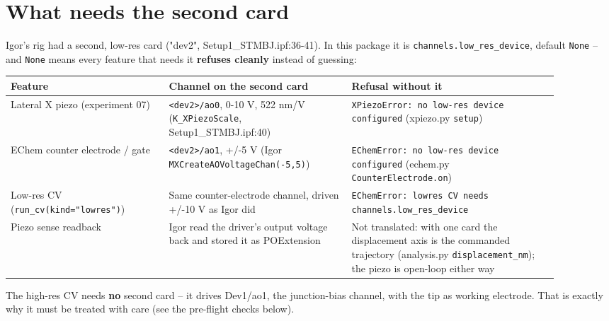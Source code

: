 \section{What needs the second card}

Igor's rig had a second, low-res card ("dev2", Setup1\_STMBJ.ipf:36-41). In this package it is \texttt{channels.\discretionary{}{}{}low\_\discretionary{}{}{}res\_\discretionary{}{}{}device}, default \texttt{None} -- and \texttt{None} means every feature that needs it \textbf{refuses cleanly} instead of guessing:

\small\setlength{\LTleft}{0pt}\setlength{\LTright}{\fill}
\begin{longtable}{@{}>{\raggedright\arraybackslash}p{0.26\linewidth}>{\raggedright\arraybackslash}p{0.30\linewidth}>{\raggedright\arraybackslash}p{0.34\linewidth}@{}}
\toprule
\textbf{Feature} & \textbf{Channel on the second card} & \textbf{Refusal without it} \\
\midrule\endhead
Lateral X piezo (experiment 07) & \texttt{<dev2>/\discretionary{}{}{}ao0}, 0-10 V, 522 nm/V (\texttt{K\_\discretionary{}{}{}XPiezo\discretionary{}{}{}Scale}, Setup1\_STMBJ.ipf:40) & \texttt{XPiezo\discretionary{}{}{}Error: no low-res device configured} (xpiezo.py \texttt{setup}) \\
EChem counter electrode / gate & \texttt{<dev2>/\discretionary{}{}{}ao1}, +/-5 V (Igor \texttt{MXCreate\discretionary{}{}{}AOVoltage\discretionary{}{}{}Chan(-5,\discretionary{}{}{}5)}) & \texttt{EChem\discretionary{}{}{}Error: no low-res device configured} (echem.py \texttt{Counter\discretionary{}{}{}Electrode.\discretionary{}{}{}on}) \\
Low-res CV (\texttt{run\_\discretionary{}{}{}cv(kind="lowres")}) & Same counter-electrode channel, driven +/-10 V as Igor did & \texttt{EChem\discretionary{}{}{}Error: lowres CV needs channels.\discretionary{}{}{}low\_\discretionary{}{}{}res\_\discretionary{}{}{}device} \\
Piezo sense readback & Igor read the driver's output voltage back and stored it as POExtension & Not translated: with one card the displacement axis is the commanded trajectory (analysis.py \texttt{displacement\_\discretionary{}{}{}nm}); the piezo is open-loop either way \\
\bottomrule
\end{longtable}
\normalsize

The high-res CV needs \textbf{no} second card -- it drives Dev1/ao1, the junction-bias channel, with the tip as working electrode. That is exactly why it must be treated with care (see the pre-flight checks below).

